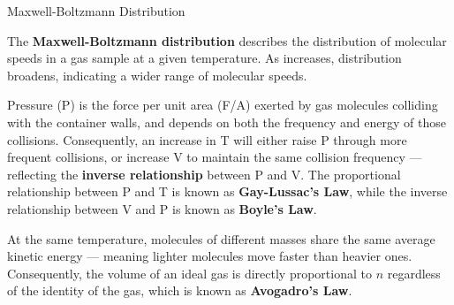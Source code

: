 \documentclass[10pt]{article}
\begin{document}
  \begin{core}[label=core:max_boltz_dis]{Maxwell-Boltzmann Distribution}

    The \textbf{Maxwell-Boltzmann distribution} describes the distribution of molecular speeds in a gas sample at a given temperature. As  increases, distribution broadens, indicating a wider range of molecular speeds.


    Pressure (P) is the force per unit area (F/A) exerted by gas molecules colliding with the container walls, and depends on both the frequency and energy of those collisions. Consequently, an increase in T will either raise P through more frequent collisions, or increase V to maintain the same collision frequency --- reflecting the \textbf{inverse relationship} between P and V. The proportional relationship between P and T is known as \textbf{Gay-Lussac's Law}, while the inverse relationship between V and P is known as \textbf{Boyle's Law}.

    At the same temperature, molecules of different masses share the same average kinetic energy --- meaning lighter molecules move faster than heavier ones. Consequently, the volume of an ideal gas is directly proportional to $n$ regardless of the identity of the gas, which is known as \textbf{Avogadro's Law}.


\end{core}
\end{document}
